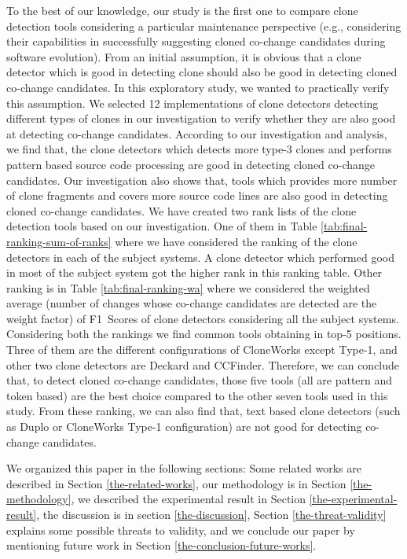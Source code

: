 \documentclass[review]{elsarticle}
\begin{document}
To the best of our knowledge, our study is the first one to compare clone detection tools considering a particular maintenance perspective (e.g., considering their capabilities in successfully suggesting cloned co-change candidates during software evolution). From an initial assumption, it is obvious that a clone detector which is good in detecting clone should also be good in detecting cloned co-change candidates. In this exploratory study, we wanted to practically verify this assumption. We selected 12 implementations of clone detectors detecting different types of clones in our investigation to verify whether they are also good at detecting co-change candidates. According to our investigation and analysis, we find that, the clone detectors which detects more type-3 clones and performs pattern based source code processing are good in detecting cloned co-change candidates. Our investigation also shows that, tools which provides more number of clone fragments and covers more source code lines are also good in detecting cloned co-change candidates. We have created two rank lists of the clone detection tools based on our investigation. One of them in Table \ref{tab:final-ranking-sum-of-ranks} where we have considered the ranking of the clone detectors in each of the subject systems. A clone detector which performed good in most of the subject system got the higher rank in this ranking table. Other ranking is in Table \ref{tab:final-ranking-wa} where we considered the weighted average (number of changes whose co-change candidates are detected are the weight factor) of F1~Scores of clone detectors considering all the subject systems. Considering both the rankings we find common tools obtaining in top-5 positions. Three of them are the different configurations of CloneWorks except Type-1, and other two clone detectors are Deckard and CCFinder. Therefore, we can conclude that, to detect cloned co-change candidates, those five tools (all are pattern and token based) are the best choice compared to the other seven tools used in this study. From these ranking, we can also find that, text based clone detectors (such as Duplo or CloneWorks Type-1 configuration) are not good for detecting co-change candidates.  

We organized this paper in the following sections: Some related works are described in Section \ref{the-related-works}, our methodology is in Section \ref{the-methodology}, we described the experimental result in Section \ref{the-experimental-result}, the discussion is in section \ref{the-discussion}, Section \ref{the-threat-validity} explains some possible threats to validity, and we conclude our paper by mentioning future work in Section \ref{the-conclusion-future-works}.
\end{document}
